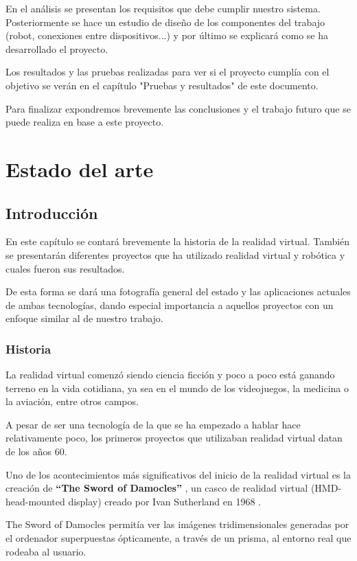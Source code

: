 \documentclass[twoside, 12pt]{epstfg}
\begin{document}
En el análisis se presentan los requisitos que debe cumplir nuestro sistema. Posteriormente se hace un estudio de diseño de los componentes del trabajo (robot, conexiones entre dispositivos...) y por último se explicará como se ha desarrollado el proyecto.

Los resultados y las pruebas realizadas para ver si el proyecto cumplía con el objetivo se verán en el capítulo "Pruebas y resultados" de este documento.

Para finalizar expondremos brevemente las conclusiones y el trabajo futuro que se puede realiza en base a este proyecto.

\chapter{Estado del arte}

\section{Introducción}
En este capítulo se contará brevemente la historia de la realidad virtual.
También se presentarán diferentes proyectos que ha utilizado realidad virtual y robótica y cuales fueron sus resultados.

De esta forma se dará una fotografía general del estado y las aplicaciones actuales de ambas tecnologías, dando especial importancia a aquellos proyectos con un enfoque similar al de nuestro trabajo.

\subsection{Historia}
La realidad virtual comenzó siendo ciencia ficción y poco a poco está ganando terreno en la vida cotidiana, ya sea en el mundo de los videojuegos, la medicina o la aviación, entre otros campos.

A pesar de ser una tecnología de la que se ha empezado a hablar hace relativamente poco, los primeros proyectos que utilizaban realidad virtual datan de los años 60.

Uno de los  acontecimientos más significativos del inicio de la realidad virtual es la creación de \textbf{“The Sword of Damocles”} , un casco de realidad virtual (HMD- head-mounted display)  creado por Ivan Sutherland en 1968 \cite{Sutherland}.

The Sword of Damocles permitía ver las imágenes tridimensionales generadas por el
ordenador superpuestas ópticamente, a través de un prisma, al entorno real que rodeaba al usuario.
\end{document}
